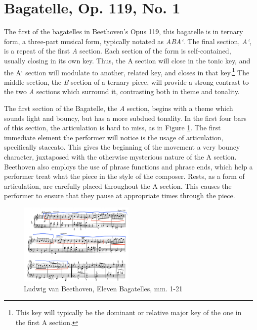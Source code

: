 \section{Bagatelle, Op. 119, No. 1}
The first of the bagatelles in Beethoven's Opus 119, this bagatelle is in ternary form, a three-part musical form, typically notated as \textit{ABA`}. The final section, \textit{A`}, is a repeat of the first \textit{A} section. Each section of the form is self-contained, usually closing in its own key\autocite{Tucker_Cochrane_2011}. Thus, the A section will close in the tonic key, and the A` section will modulate to another, related key, and closes in that key.\footnote{This key will typically be the dominant or relative major key of the one in the first A section.} The middle section, the \textit{B} section of a ternary piece, will provide a strong contrast to the two \textit{A} sections which surround it, contrasting both in theme and tonality.

The first section of the Bagatelle, the \textit{A} section, begins with a theme which sounds light and bouncy, but has a more subdued tonality. In the first four bars of this section, the articulation is hard to miss, as in Figure \ref{fig:beethoven-first-a-section-structure}\autocite{Henle_1978}. The first immediate element the performer will notice is the usage of articulation, specifically staccato. This gives the beginning of the movement a very bouncy character, juxtaposed with the otherwise mysterious nature of the A section. Beethoven also employs the use of phrase functions and phrase ends, which help a performer treat what the piece  in the style of the composer. Rests, as a form of articulation, are carefully placed throughout the A section. This causes the performer to ensure that they pause at appropriate times through the piece. 

\begin{figure}[h]
	\centering
	\includegraphics[width=0.5\textwidth]{figures/beethoven-first-a-section-structure.jpg}
	\caption{Ludwig van Beethoven, Eleven Bagatelles, mm. 1-21}
	\label{fig:beethoven-first-a-section-structure}
\end{figure}

